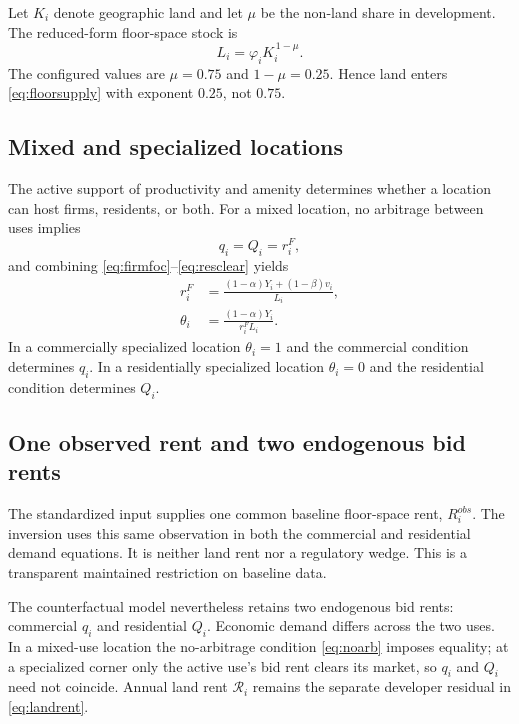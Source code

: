\documentclass[11pt,a4paper]{article}
\newcommand{\Rland}{\mathcal{R}}
\begin{document}
Let $K_i$ denote geographic land and let $\mu$ be the non-land share in
development. The reduced-form floor-space stock is
\begin{equation}
 L_i=\varphi_iK_i^{\,1-\mu}.                          \label{eq:floorsupply}
\end{equation}
The configured values are $\mu=0.75$ and $1-\mu=0.25$. Hence land enters
\eqref{eq:floorsupply} with exponent $0.25$, not $0.75$.

\subsection{Mixed and specialized locations}
The active support of productivity and amenity determines whether a location
can host firms, residents, or both. For a mixed location, no arbitrage between
uses implies
\begin{equation}
 q_i=Q_i=r_i^F,                                       \label{eq:noarb}
\end{equation}
and combining \eqref{eq:firmfoc}--\eqref{eq:resclear} yields
\begin{align}
 r_i^F&=\frac{(1-\alpha)Y_i+(1-\beta)v_i}{L_i},       \label{eq:mixedrent}\\
 \theta_i&=\frac{(1-\alpha)Y_i}{r_i^FL_i}.            \label{eq:mixedshare}
\end{align}
In a commercially specialized location $\theta_i=1$ and the commercial
condition determines $q_i$. In a residentially specialized location
$\theta_i=0$ and the residential condition determines $Q_i$.

\subsection{One observed rent and two endogenous bid rents}
The standardized input supplies one common baseline floor-space rent,
$R_i^{obs}$. The inversion uses this same observation in both the commercial
and residential demand equations. It is neither land rent nor a regulatory
wedge. This is a transparent maintained restriction on baseline data.

The counterfactual model nevertheless retains two endogenous bid rents:
commercial $q_i$ and residential $Q_i$. Economic demand differs across the two
uses. In a mixed-use location the no-arbitrage condition \eqref{eq:noarb}
imposes equality; at a specialized corner only the active use's bid rent clears
its market, so $q_i$ and $Q_i$ need not coincide. Annual land rent
$\Rland_i$ remains the separate developer residual in \eqref{eq:landrent}.
\end{document}
